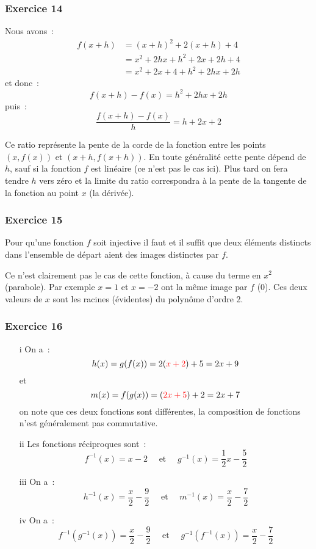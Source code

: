 \documentclass[10pt,notheorems]{beamer}
\newcommand{\red}{\color{red}}
\theoremstyle{plain}
\theoremstyle{definition} %
\begin{document}
\begin{frame}
  \frametitle{Exercice 14}
  \fontsize{8}{10}\selectfont


  Nous avons~:
  \[
    \begin{split}
      f(x+h) &= (x+h)^2 + 2(x+h) + 4\\
      &= x^2+2hx+h^2+2x+2h+4\\
      &= x^2+2x+4+h^2+2hx+2h
    \end{split}
  \]
  et donc~:
  \[
    f(x+h)-f(x) = h^2 + 2hx + 2h
  \]
  puis~:
  \[
    \frac{f(x+h)-f(x)}{h} = h + 2x + 2
  \]

  \bigskip

  Ce ratio représente la pente de la corde de la fonction entre les points $(x, f(x))$ et $(x+h, f(x+h))$. En toute généralité cette pente dépend de $h$, sauf si la fonction $f$ est linéaire (ce n'est pas le cas ici). Plus tard on fera tendre $h$ vers zéro et la limite du ratio correspondra à la pente de la tangente de la fonction au point $x$ (la dérivée).

\end{frame}


\begin{frame}
  \frametitle{Exercice 15}
  \fontsize{8}{10}\selectfont

  Pour qu'une fonction $f$ soit injective il faut et il suffit que deux éléments distincts dans l'ensemble de départ aient des images distinctes par $f$.\newline

  Ce n'est clairement pas le cas de cette fonction, à cause du terme en $x^2$ (parabole). Par exemple $x=1$ et $x=-2$ ont la même image par $f$ (0). Ces deux valeurs de $x$ sont les racines (évidentes) du polynôme d'ordre 2.

\end{frame}


\begin{frame}
  \frametitle{Exercice 16}
  \fontsize{8}{10}\selectfont

  \begin{enumerate}
  \item[i] On a~:
    \[
      h(x) = g(f(x)) = 2 ( {\red x + 2} ) + 5 = 2x+9
    \]
    et
    \[
      m(x) = f(g(x)) = ({\red 2x+5}) + 2 = 2x+ 7
    \]
    on note que ces deux fonctions sont différentes, la composition de fonctions n'est généralement pas commutative.\newline

  \item[ii] Les fonctions réciproques sont~:
    \[
      f^{-1}(x) = x - 2 \quad\text{ et }\quad g^{-1}(x) = \frac{1}{2}x - \frac{5}{2}
    \]

  \item[iii] On a~:
    \[
      h^{-1}(x) = \frac{x}{2}-\frac{9}{2} \quad\text{ et }\quad m^{-1}(x) = \frac{x}{2}-\frac{7}{2}
    \]

  \item[iv] On a~:
    \[
      f^{-1}\left(g^{-1}(x)\right) = \frac{x}{2}-\frac{9}{2}  \quad\text{ et }\quad g^{-1}\left(f^{-1}(x)\right) = \frac{x}{2}-\frac{7}{2}
    \]
  \end{enumerate}

\end{frame}
\end{document}
